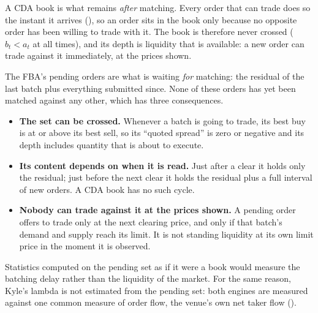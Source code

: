 A CDA book is what remains \emph{after} matching. Every order that can
trade does so the instant it arrives (), so an order
sits in the book only because no opposite order has been willing to trade
with it. The book is therefore never crossed ($b_t < a_t$ at all times),
and its depth is liquidity that is available: a new order can
trade against it immediately, at the prices shown.

The FBA's pending orders are what is waiting \emph{for} matching: the
residual of the last batch plus everything submitted since. None of
these orders has yet been matched against any other, which has three
consequences.
\begin{itemize}
  \item \textbf{The set can be crossed.} Whenever a batch is going to
  trade, its best buy is at or above its best sell, so its ``quoted
  spread'' is zero or negative and its depth includes quantity that is
  about to execute.
  \item \textbf{Its content depends on when it is read.} Just after a
  clear it holds only the residual; just before the next clear it holds
  the residual plus a full interval of new orders. A CDA book has no such
  cycle.
  \item \textbf{Nobody can trade against it at the prices shown.} A
  pending order offers to trade only at the next clearing price, and only
  if that batch's demand and supply reach its limit. It is not standing
  liquidity at its own limit price in the moment it is observed.
\end{itemize}
Statistics computed on the pending set as if it were a book would measure
the batching delay rather than the liquidity of the market. For the same
reason, Kyle's lambda is not estimated from the pending set: both engines
are measured against one common measure of order flow, the venue's own
net taker flow ().

